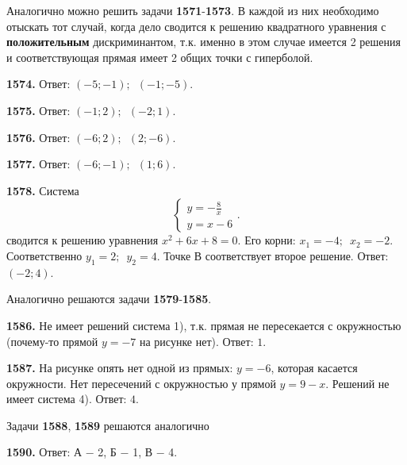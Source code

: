 Аналогично можно решить задачи  \textbf{1571}-\textbf{1573}. В каждой из них необходимо отыскать тот случай, когда дело сводится к решению квадратного уравнения с \textbf{положительным} дискриминантом, т.к. именно в этом случае имеется 2 решения и соответствующая прямая имеет 2 общих точки с гиперболой.

\textbf{1574.} \newline \null \hspace*{\fill} Ответ:  $(-5;-1);\enspace (-1;-5)$.

\textbf{1575.} \newline \null \hspace*{\fill} Ответ:  $(-1;2);\enspace (-2;1)$.

\textbf{1576.} \newline \null \hspace*{\fill} Ответ:  $(-6;2);\enspace (2;-6)$.

\textbf{1577.} \newline \null \hspace*{\fill} Ответ:  $(-6;-1);\enspace (1;6)$.

\textbf{1578.} Система $$\begin{cases}
	y=-\frac{8}{x}
	\\
	y=x-6	
\end{cases}.$$ сводится к решению уравнения $x^2+6x+8=0$.
Его корни: $x_1=-4;\enspace x_2=-2$. Соответственно $y_1=2;\enspace y_2=4$. Точке $В$ соответствует второе решение. \newline \null \hspace*{\fill} Ответ: $(-2;4)$.

Аналогично решаются задачи  \textbf{1579}-\textbf{1585}.

\textbf{1586.} Не имеет решений система 1), т.к. прямая не пересекается с окружностью (почему-то прямой $y=-7$ на рисунке нет). \newline \null \hspace*{\fill} Ответ: $1$.

\textbf{1587.}  На рисунке опять нет одной из прямых: $y=-6$, которая касается окружности. Нет пересечений с окружностью у прямой $y=9-x$. Решений не имеет система 4). \newline \null \hspace*{\fill} Ответ: $4$.

Задачи \textbf{1588}, \textbf{1589} решаются аналогично

\textbf{1590.} \newline \null \hspace*{\fill} Ответ:  А $-$ 2, Б $-$ 1, В $-$ 4.


